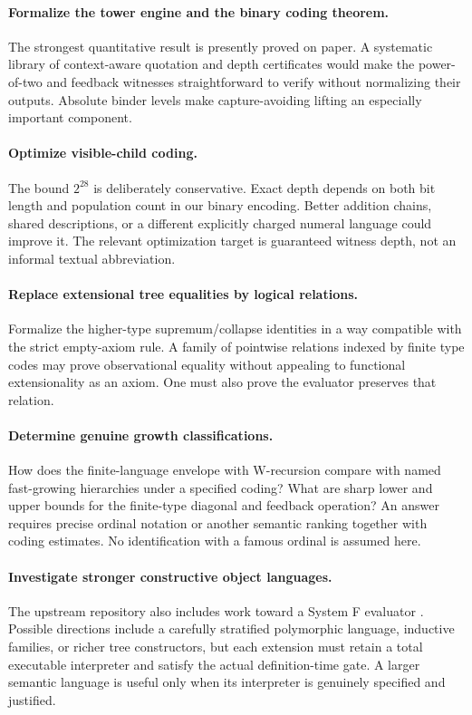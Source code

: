 \documentclass[11pt]{article}
\theoremstyle{definition}
\begin{document}
\paragraph{Formalize the tower engine and the binary coding theorem.}
The strongest quantitative result is presently proved on paper. A systematic
library of context-aware quotation and depth certificates would make the
power-of-two and feedback witnesses straightforward to verify without
normalizing their outputs. Absolute binder levels make capture-avoiding
lifting an especially important component.

\paragraph{Optimize visible-child coding.}
The bound $2^{28}$ is deliberately conservative. Exact depth depends on both
bit length and population count in our binary encoding. Better addition
chains, shared descriptions, or a different explicitly charged numeral
language could improve it. The relevant optimization target is guaranteed
witness depth, not an informal textual abbreviation.

\paragraph{Replace extensional tree equalities by logical relations.}
Formalize the higher-type supremum/collapse identities in a way compatible
with the strict empty-axiom rule. A family of pointwise relations indexed by
finite type codes may prove observational equality without appealing to
functional extensionality as an axiom. One must also prove the evaluator
preserves that relation.

\paragraph{Determine genuine growth classifications.}
How does the finite-language envelope with W-recursion compare with named
fast-growing hierarchies under a specified coding? What are sharp lower and
upper bounds for the finite-type diagonal and feedback operation? An answer
requires precise ordinal notation or another semantic ranking together with
coding estimates. No identification with a famous ordinal is assumed here.

\paragraph{Investigate stronger constructive object languages.}
The upstream repository also includes work toward a System F evaluator
\cite{systemf}. Possible directions include a carefully stratified
polymorphic language, inductive families, or richer tree constructors, but
each extension must retain a total executable interpreter and satisfy the
actual definition-time gate. A larger semantic language is useful only when
its interpreter is genuinely specified and justified.
\end{document}
